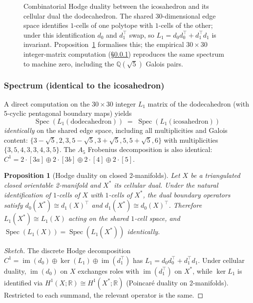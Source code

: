 \documentclass[12pt,a4paper]{article}
\newtheorem{proposition}[theorem]{Proposition}
\theoremstyle{definition}
\theoremstyle{remark}
\newcommand{\bR}{\mathbb{R}}
\newcommand{\bQ}{\mathbb{Q}}                %
\DeclareMathOperator{\Spec}{Spec}
\begin{document}
\begin{figure}[H]
\caption{Combinatorial Hodge duality between the icosahedron and its
cellular dual the dodecahedron. The shared $30$-dimensional edge space
identifies $1$-cells of one polytope with $1$-cells of the other; under
this identification $d_0$ and $d_1^\top$ swap, so $L_1 = d_0 d_0^\top +
d_1^\top d_1$ is invariant. Proposition~\ref{prop:hodge-duality} formalises
this; the empirical $30 \times 30$ integer-matrix computation
(\S\ref{sec:dodec-spectrum}) reproduces the same spectrum to machine
zero, including the $\bQ(\sqrt 5)$ Galois pairs.}
\label{fig:hodge-duality}
\end{figure}


\subsubsection{Spectrum (identical to the icosahedron)}\label{sec:dodec-spectrum}

A direct computation on the $30 \times 30$ integer $L_1$ matrix of the
dodecahedron (with 5-cyclic pentagonal boundary maps) yields
\[
  \Spec(L_1(\text{dodecahedron})) \;=\; \Spec(L_1(\text{icosahedron}))
\]
\emph{identically} on the shared edge space, including all
multiplicities and Galois content: $\{3 - \sqrt 5, 2, 3, 5 - \sqrt 5,
3 + \sqrt 5, 5, 5 + \sqrt 5, 6\}$ with multiplicities $\{3, 5, 4, 3, 3,
4, 3, 5\}$. The $A_5$ Frobenius decomposition is also identical:
$C^1 = 2 \cdot [3a] \oplus 2 \cdot [3b] \oplus 2 \cdot [4] \oplus
2 \cdot [5]$.

\begin{proposition}[Hodge duality on closed 2-manifolds]\label{prop:hodge-duality}
Let $X$ be a triangulated closed orientable 2-manifold and $X^*$ its
cellular dual. Under the natural identification of $1$-cells of $X$
with $1$-cells of $X^*$, the dual boundary operators satisfy
$d_0(X^*) \cong d_1(X)^\top$ and $d_1(X^*) \cong d_0(X)^\top$. Therefore
$L_1(X^*) \cong L_1(X)$ acting on the shared $1$-cell space, and
$\Spec(L_1(X)) = \Spec(L_1(X^*))$ identically.
\end{proposition}

\begin{proof}[Sketch]
The discrete Hodge decomposition $C^1 = \operatorname{im}(d_0) \oplus \ker(L_1)
\oplus \operatorname{im}(d_1^\top)$ has $L_1 = d_0 d_0^\top + d_1^\top d_1$.
Under cellular duality, $\operatorname{im}(d_0)$ on $X$ exchanges roles with
$\operatorname{im}(d_1^\top)$ on $X^*$, while $\ker L_1$ is identified via
$H^1(X; \bR) \cong H^1(X^*; \bR)$ (Poincaré duality on 2-manifolds).
Restricted to each summand, the relevant operator is the same.
\end{proof}
\end{document}

